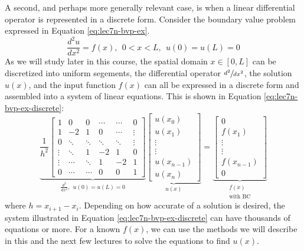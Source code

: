 A second, and perhaps more generally relevant case, is when a linear differential operator is represented in a discrete form.  Consider the boundary value problem expressed in Equation \ref{eq:lec7n-bvp-ex}.
\begin{equation}
\frac{d^2 u}{d x^2} = f(x), \ \ 0 < x < L, \ \ u(0) = u(L) = 0
\label{eq:lec7n-bvp-ex}
\end{equation}
As we will study later in this course, the spatial domain $x \in [0,L]$ can be discretized into uniform segements, the differential operator $\sfrac{d^2}{dx^2}$, the solution $u(x)$, and the input function $f(x)$ can all be expressed in a discrete form and assembled into a system of linear equations.  This is shown in Equation \ref{eq:lec7n-bvp-ex-discrete}:
\begin{equation}
\underbrace{
\frac{1}{h^2}
\left[
\begin{matrix}
1 & 0 & 0 & \cdots & \cdots &  0 \\
1 & -2 & 1 & 0 & \cdots & \vdots \\
0 & \ddots & \ddots & \ddots & \ddots& \vdots \\
\vdots &  \ddots & 1 & -2 & 1 &  0 \\
\vdots & \cdots & \ddots & 1 & -2 & 1  \\
0 & \cdots & \cdots & 0 & 0 & 1
\end{matrix}
\right]
}_{\frac{d^2}{dx^2}, \ \  u(0)=u(L)=0}
\underbrace{
\left[
\begin{matrix}
u(x_0) \\
u(x_1) \\
\vdots \\
\vdots \\
u(x_{n-1}) \\
u(x_n)
\end{matrix}
\right]
}_{u(x)}
=
\underbrace{
\left[
\begin{matrix}
0 \\
f(x_1) \\
\vdots \\
\vdots \\
f(x_{n-1}) \\
0
\end{matrix}
\right]
}_{\substack{f(x) \\ \text{with BC}}}
\label{eq:lec7n-bvp-ex-discrete}
\end{equation}
where $h = x_{i+1} - x_i$.  Depending on how accurate of a solution is desired, the system illustrated in Equation \ref{eq:lec7n-bvp-ex-discrete} can have thousands of equations or more.  For a known $f(x)$, we can use the methods we will describe in this and the next few lectures to solve the equations to find $u(x)$.

